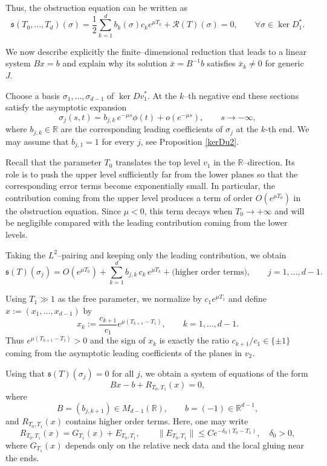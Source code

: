 \documentclass{amsart}
\newcommand{\R}{\mathbb{R}}
\begin{document}
Thus, the obstruction equation can be written as
\begin{equation}\label{eq:obstruction-explicit}
\mathfrak{s}(T_0,\dots,T_d)(\sigma)
=
\frac12 \sum_{k=1}^d b_k(\sigma)c_k e^{\mu T_k}
+
\mathcal{R}(T)(\sigma)
=0,
\qquad
\forall \sigma\in \ker D_1^*.
\end{equation}

We now describe explicitly the finite–dimensional reduction that leads
to a linear system $Bx=b$ and explain why its solution $\bar x=B^{-1}b$ satisfies
$\bar x_k \neq 0$ for generic $J$.

Choose a basis
$\sigma_1,\dots,\sigma_{d-1}$
of $\ker Dv_1^*$. 
At the $k$–th negative end these sections satisfy the asymptotic
expansion
$$
\sigma_j(s,t)
=
b_{j,k}\,e^{-\mu s}\phi(t)
+
o(e^{-\mu s}),
\qquad s\to-\infty,
$$
where $b_{j,k}\in\R$ are the corresponding leading coefficients of $\sigma_j$ at the $k$-th end. We may assume that $b_{j,1}=1$ for every $j$, see Proposition \ref{kerDu2}.
 
Recall that the parameter $T_0$ translates the top level $v_1$ in the
$\R$–direction. Its role is to push the upper level sufficiently far from the
lower planes so that the corresponding error terms become exponentially small.
In particular, the contribution coming from the upper level produces a term of
order $O(e^{\mu T_0})$ in the obstruction equation. Since $\mu<0$, this term
decays when $T_0\to+\infty$ and will be negligible compared with the leading
contribution coming from the lower levels.

Taking the $L^2$–pairing and keeping only the leading contribution, we obtain
\begin{equation}\label{obstruction_non_linear}
\mathfrak s(T)(\sigma_j)
=
O(e^{\mu T_0})+ \sum_{k=1}^{d} b_{j,k}\, c_k\, e^{\mu T_k}
+
\text{(higher order terms)}, \qquad  j=1,\ldots, d-1.
\end{equation}

Using $T_1\gg 1$ as the free parameter, we normalize by
$c_1e^{\mu T_1}$ and define $x:=(x_1,\ldots,x_{d-1})$ by
$$
x_{k}:=\frac{c_{k+1}}{c_1}e^{\mu(T_{k+1}-T_1)}
,\qquad k=1,\dots,d-1.
$$
Thus $e^{\mu(T_{k+1}-T_1)}>0$ and the sign of $x_{k}$ is exactly the 
ratio $c_{k+1}/c_1\in\{\pm1\}$ coming from the asymptotic leading coefficients
of the planes in $v_2$.



Using that $\mathfrak s(T)(\sigma_j)=0$ for all $j$, we obtain a system of equations of the form
\begin{equation}\label{non-linear_x}
Bx-b + R_{T_0,T_1}(x)=0,
\end{equation}
where 
$$
B=(b_{j,k+1})\in M_{d-1}(\R), \qquad b=(-1)\in\R^{d-1},$$ 
and
$R_{T_0,T_1}(x)$ contains higher order terms. Here, one may write
$$
R_{T_0,T_1}(x)=G_{T_1}(x)+E_{T_0,T_1},
\qquad
\|E_{T_0,T_1}\|\le C e^{-\delta_0 (T_0-T_1)}, \quad \delta_0>0,
$$
where $G_{T_1}(x)$ depends only on the relative neck data and the local
gluing near the ends.
\end{document}

